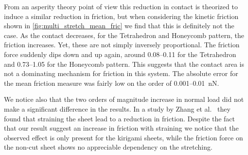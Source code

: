 From an asperity theory point of view this reduction in contact is theorized to induce a similar reduction in friction, but when considering the kinetic friction shown in \cref{fig:multi_stretch_mean_fric} we find that this is definitely not the case. As the contact decreases, for the Tetrahedron and Honeycomb pattern, the friction increases. Yet, these are not simply inversely proportional. The friction force suddenly dips down and up again, around 0.08--0.11 for the Tetrahedron and 0.73--1.05 for the Honeycomb pattern. This
suggests that the contact area is not a dominating mechanism for friction in this
system. The absolute error for the mean friction measure was fairly low on the order of 0.001--\SI{0.01}{nN}.

We notice also that the two orders of magnitude increase in normal load
did not make a significant difference in the results. In a study by Zhang et al.\ \cite{zhang_tuning_2019} they found that straining the sheet lead to a reduction in friction. Despite the fact that our result suggest an increase in friction with straining we notice that the observed effect is only present for the kirigami sheets, while the friction force on the non-cut sheet shows no appreciable dependency on the stretching.



















